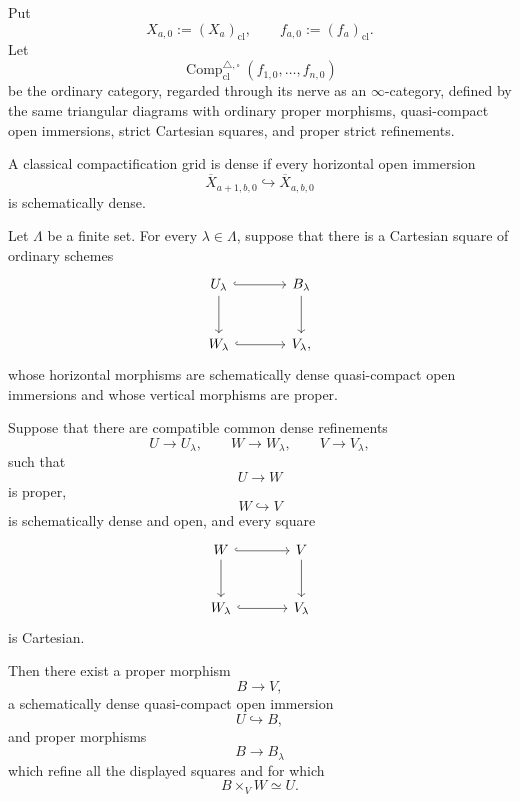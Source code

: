 \begin{definition}
\label{def:strict-classical-compactification-grid}
Put
\[
    X_{a,0}
    :=
    (X_a)_{\mathrm{cl}},
    \qquad
    f_{a,0}
    :=
    (f_a)_{\mathrm{cl}}.
\]
Let
\[
    \operatorname{Comp}^{\triangle,\square}_{\mathrm{cl}}
    (f_{1,0},\ldots,f_{n,0})
\]
be the ordinary category, regarded through its nerve as an
\(\infty\)-category, defined by the same triangular diagrams with ordinary
proper morphisms, quasi-compact open immersions, strict Cartesian squares,
and proper strict refinements.

A classical compactification grid is dense if every horizontal open
immersion
\[
    \overline X_{a+1,b,0}
    \hookrightarrow
    \overline X_{a,b,0}
\]
is schematically dense.
\end{definition}

\begin{lemma}
\label{lem:relative-grid-cell-refinement}
Let \(\Lambda\) be a finite set.  For every \(\lambda\in\Lambda\), suppose
that there is a Cartesian square of ordinary schemes
\[
\begin{tikzcd}[column sep=large,row sep=large]
    U_\lambda
        \arrow[r,hook]
        \arrow[d]
        &
    B_\lambda
        \arrow[d]
    \\
    W_\lambda
        \arrow[r,hook]
        &
    V_\lambda,
\end{tikzcd}
\]
whose horizontal morphisms are schematically dense quasi-compact open
immersions and whose vertical morphisms are proper.

Suppose that there are compatible common dense refinements
\[
    U\longrightarrow U_\lambda,
    \qquad
    W\longrightarrow W_\lambda,
    \qquad
    V\longrightarrow V_\lambda,
\]
such that
\[
    U\longrightarrow W
\]
is proper,
\[
    W\hookrightarrow V
\]
is schematically dense and open, and every square
\[
\begin{tikzcd}[column sep=large,row sep=large]
    W \arrow[r,hook] \arrow[d]
        & V \arrow[d] \\
    W_\lambda \arrow[r,hook]
        & V_\lambda
\end{tikzcd}
\]
is Cartesian.

Then there exist a proper morphism
\[
    B\longrightarrow V,
\]
a schematically dense quasi-compact open immersion
\[
    U\hookrightarrow B,
\]
and proper morphisms
\[
    B\longrightarrow B_\lambda
\]
which refine all the displayed squares and for which
\[
    B\times_VW
    \simeq
    U.
\]
\end{lemma}


